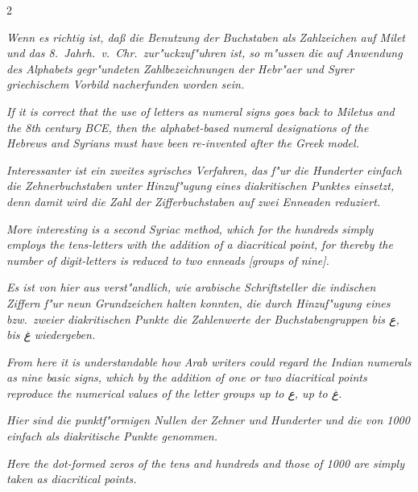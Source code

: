 \documentclass[10pt,a4paper]{article}
\newcommand{\RL}[1]{\beginR#1\endR}
\newcommand{\ar}[1]{{\arabicfont\RL{#1}}}
\begin{document}
\begin{paracol}{2}
\switchcolumn*

\textit{Wenn es richtig ist, da\ss{} die Benutzung der Buchstaben als Zahlzeichen auf Milet und das 8.\ Jahrh.\ v.\ Chr.\ zur"uckzuf"uhren ist, so m"ussen die auf Anwendung des Alphabets gegr"undeten Zahlbezeichnungen der Hebr"aer und Syrer griechischem Vorbild nacherfunden worden sein.}

\switchcolumn

\textit{If it is correct that the use of letters as numeral signs goes back to Miletus and the 8th century BCE, then the alphabet-based numeral designations of the Hebrews and Syrians must have been re-invented after the Greek model.}

\switchcolumn*

\textit{Interessanter ist ein zweites syrisches Verfahren, das f"ur die Hunderter einfach die Zehnerbuchstaben unter Hinzuf"ugung eines diakritischen Punktes einsetzt, denn damit wird die Zahl der Zifferbuchstaben auf zwei Enneaden reduziert.}

\switchcolumn

\textit{More interesting is a second Syriac method, which for the hundreds simply employs the tens-letters with the addition of a diacritical point, for thereby the number of digit-letters is reduced to two enneads [groups of nine].}

\switchcolumn*

\textit{Es ist von hier aus verst"andlich, wie arabische Schriftsteller die indischen Ziffern f"ur neun Grundzeichen halten konnten, die durch Hinzuf"ugung eines bzw.\ zweier diakritischen Punkte die Zahlenwerte der Buchstabengruppen bis \ar{ع}, bis \ar{غ} wiedergeben.}

\switchcolumn

\textit{From here it is understandable how Arab writers could regard the Indian numerals as nine basic signs, which by the addition of one or two diacritical points reproduce the numerical values of the letter groups up to \ar{ع}, up to \ar{غ}.}

\switchcolumn*

\textit{Hier sind die punktf"ormigen Nullen der Zehner und Hunderter und die von 1000 einfach als diakritische Punkte genommen.}

\switchcolumn

\textit{Here the dot-formed zeros of the tens and hundreds and those of 1000 are simply taken as diacritical points.}

\end{paracol}
\end{document}
